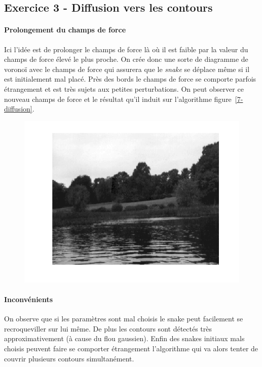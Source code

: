 \documentclass{article}
\begin{document}
\subsection{Exercice 3 - Diffusion vers les contours}
\paragraph{Prolongement du champs de force}
Ici l'idée est de prolonger le champs de force là où il est faible par la valeur du champs de force élevé le plus proche. On crée donc une sorte de diagramme de voronoï avec le champs de force qui assurera que le \emph{snake} se déplace même si il est initialement mal placé. Près des bords le champs de force se comporte parfois étrangement et est très sujets aux petites perturbations. On peut observer ce nouveau champs de force et le résultat qu'il induit sur l'algorithme figure~\ref{7-diffusion}.

\begin{figure}[!ht]
\includegraphics[width=\textwidth]{images/1/1-1-autumn_b.png}
\end{figure}

\paragraph{Inconvénients}
On observe que si les paramètres sont mal choisis le snake peut facilement se recroqueviller sur lui même. De plus les contours sont détectés très approximativement (à cause du flou gaussien). Enfin des snakes initiaux mals choisis peuvent faire se comporter étrangement l'algorithme qui va alors tenter de couvrir plusieurs contours simultanément.
\end{document}
